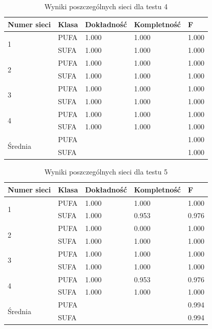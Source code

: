 \documentclass{classrep}
\begin{document}
\begin{table}
\caption{Wyniki poszczególnych sieci dla testu 4}
\label{testTab5}
\begin{tabular}{|p{1.5cm}|p{2.5cm}|p{2.5cm}|p{2.5cm}|p{2.5cm}|}
 \textbf{Numer sieci} & \textbf{Klasa} & \textbf{Dokładność} & \textbf{Kompletność} & \textbf{F} \\ \hline
\multirow{2}{*}{1} 
& PUFA & 1.000 & 1.000 & 1.000 \\
& SUFA & 1.000 & 1.000 & 1.000 \\ \hline
\multirow{2}{*}{2} 
& PUFA & 1.000 & 1.000 & 1.000 \\
& SUFA & 1.000 & 1.000 & 1.000 \\ \hline
\multirow{2}{*}{3} 
& PUFA & 1.000 & 1.000 & 1.000 \\
& SUFA & 1.000 & 1.000 & 1.000\\ \hline
\multirow{2}{*}{4} 
& PUFA & 1.000 & 1.000 & 1.000 \\
& SUFA & 1.000 & 1.000 & 1.000 \\ \hline
\multirow{2}{*}{Średnia}
& PUFA &       &       & 1.000 \\
& SUFA &       &       & 1.000 \\\hline
\end{tabular}
\end{table}

\begin{table}
\caption{Wyniki poszczególnych sieci dla testu 5}
\label{testTab6}
\begin{tabular}{|p{1.5cm}|p{2.5cm}|p{2.5cm}|p{2.5cm}|p{2.5cm}|}
 \textbf{Numer sieci} & \textbf{Klasa} & \textbf{Dokładność} & \textbf{Kompletność} & \textbf{F} \\ \hline
\multirow{2}{*}{1} 
& PUFA & 1.000 & 1.000 & 1.000 \\
& SUFA & 1.000 & 0.953 & 0.976 \\ \hline
\multirow{2}{*}{2} 
& PUFA & 1.000 & 0.000 & 1.000 \\
& SUFA & 1.000 & 1.000 & 1.000 \\ \hline
\multirow{2}{*}{3} 
& PUFA & 1.000 & 1.000 & 1.000 \\
& SUFA & 1.000 & 1.000 & 1.000\\ \hline
\multirow{2}{*}{4} 
& PUFA & 1.000 & 0.953 & 0.976 \\
& SUFA & 1.000 & 1.000 & 1.000 \\ \hline
\multirow{2}{*}{Średnia}
& PUFA &       &       & 0.994 \\
& SUFA &       &       & 0.994 \\\hline
\end{tabular}
\end{table}
\end{document}

